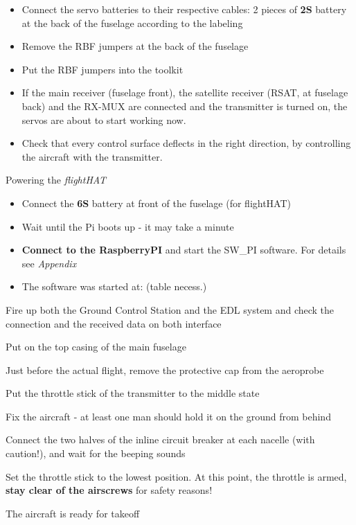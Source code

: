 \begin{todolist}
	  \begin{itemize}
	  \itemsep1pt\parskip0pt
	  \item
	    Connect the servo batteries to their respective cables: 2 pieces of
	    \textbf{2S} battery at the back of the fuselage according to the
	    labeling
	  \item
	    Remove the RBF jumpers at the back of the fuselage
	  \item
	    Put the RBF jumpers into the toolkit
	  \item
	    If the main receiver (fuselage front), the satellite receiver (RSAT,
	    at fuselage back) and the RX-MUX are connected and the transmitter
	    is turned on, the servos are about to start working now.
	  \item
	    Check that every control surface deflects in the right direction, by
	    controlling the aircraft with the transmitter.
	  \end{itemize}
	\item
	  Powering the \emph{flightHAT}
	
	  \begin{itemize}
	  \itemsep1pt\parskip0pt
	  \item
	    Connect the \textbf{6S} battery at front of the fuselage (for
	    flightHAT)
	  \item
	    Wait until the Pi boots up - it may take a minute
	  \item
	    \textbf{Connect to the RaspberryPI} and start the SW\_PI software.
	    For details see \emph{Appendix}
	  \item
	    The software was started at: (table necess.)
	  \end{itemize}
	\item
	  Fire up both the Ground Control Station and the EDL system and check
	  the connection and the received data on both interface
	\item
	  Put on the top casing of the main fuselage
	\item
	  Just before the actual flight, remove the protective cap from the
	  aeroprobe
	\item
	  Put the throttle stick of the transmitter to the middle state
	\item
	  Fix the aircraft - at least one man should hold it on the ground from
	  behind
	\item
	  Connect the two halves of the inline circuit breaker at each nacelle
	  (with caution!), and wait for the beeping sounds
	\item
	  Set the throttle stick to the lowest position. At this point, the
	  throttle is armed, \textbf{stay clear of the airscrews} for safety
	  reasons!
	\item
	  The aircraft is ready for takeoff
	\end{todolist}

